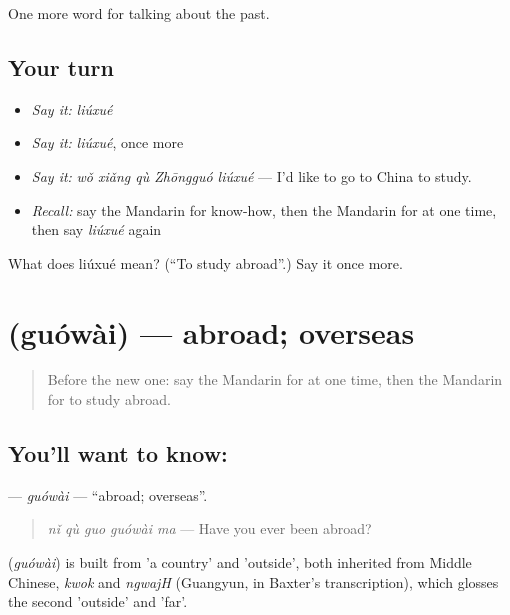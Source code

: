 \begin{grammarlens}[title={What you've built}]
One more word for talking about the past.
\end{grammarlens}

\subsection*{Your turn}
\begin{itemize}
\raggedright
  \item \emph{Say it:} \emph{liúxué}
  \item \emph{Say it:} \emph{liúxué}, once more
  \item \emph{Say it:} \emph{wǒ xiǎng qù Zhōngguó liúxué} — I'd like to go to China to study.
  \item \emph{Recall:} say the Mandarin for know-how, then the Mandarin for at one time, then say \emph{liúxué} again
\end{itemize}

\begin{tcolorbox}[breakable,colback=teal!4,colframe=teal!35!black,title={Before you move on}]
What does liúxué mean? (\textquotedblleft{}To study abroad\textquotedblright{}.) Say it once more.
\end{tcolorbox}
\section[\texorpdfstring{\zh{国外} (guówài)}{国外 (guówài)}]{ (guówài) — abroad; overseas}

\label{lesson:ZH-C261-guowai}



\begin{quote}
Before the new one: say the Mandarin for at one time, then the Mandarin for to study abroad.
\end{quote}

\subsection*{You'll want to know: }
\textbf{} — \emph{guówài} — \textquotedblleft{}abroad; overseas\textquotedblright{}.

\begin{quote}
\textbf{} \emph{nǐ qù guo guówài ma} — Have you ever been abroad?
\end{quote}

\begin{cousinweb}
\textbf{} (\emph{guówài}) is built from  'a country' and  'outside', both inherited from Middle Chinese, \emph{kwok} and \emph{ngwajH} (Guangyun, in Baxter's transcription), which glosses the second 'outside' and 'far'.
\end{cousinweb}

